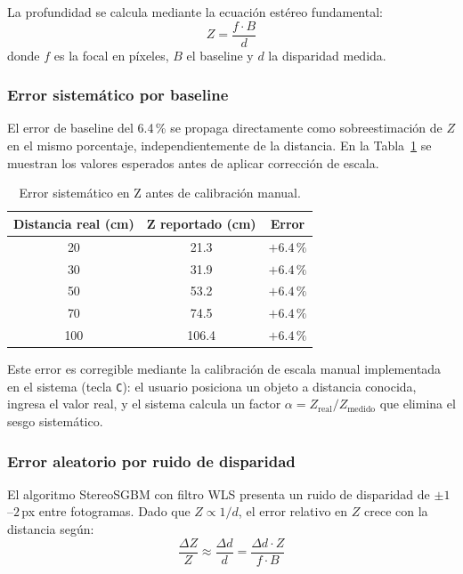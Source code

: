 La profundidad se calcula mediante la ecuación estéreo fundamental:
\[
Z = \frac{f \cdot B}{d}
\]
donde $f$ es la focal en píxeles, $B$ el baseline y $d$ la disparidad medida.

\subsubsection{Error sistemático por baseline}

El error de baseline del 6.4\,\% se propaga directamente como sobreestimación de $Z$ en el mismo porcentaje, independientemente de la distancia. En la Tabla~\ref{tab:error_sistematico} se muestran los valores esperados antes de aplicar corrección de escala.

\begin{table}[H]
\centering
\caption{Error sistemático en Z antes de calibración manual.}
\label{tab:error_sistematico}
\begin{tabular}{ccc}
\hline
\textbf{Distancia real (cm)} & \textbf{Z reportado (cm)} & \textbf{Error} \\
\hline
20  & 21.3  & $+6.4\,\%$ \\
30  & 31.9  & $+6.4\,\%$ \\
50  & 53.2  & $+6.4\,\%$ \\
70  & 74.5  & $+6.4\,\%$ \\
100 & 106.4 & $+6.4\,\%$ \\
\hline
\end{tabular}
\end{table}

Este error es corregible mediante la calibración de escala manual implementada en el sistema (tecla \texttt{C}): el usuario posiciona un objeto a distancia conocida, ingresa el valor real, y el sistema calcula un factor $\alpha = Z_{\text{real}} / Z_{\text{medido}}$ que elimina el sesgo sistemático.

\subsubsection{Error aleatorio por ruido de disparidad}

El algoritmo StereoSGBM con filtro WLS presenta un ruido de disparidad de $\pm 1$–$2$\,px entre fotogramas. Dado que $Z \propto 1/d$, el error relativo en $Z$ crece con la distancia según:
\[
\frac{\Delta Z}{Z} \approx \frac{\Delta d}{d} = \frac{\Delta d \cdot Z}{f \cdot B}
\]

